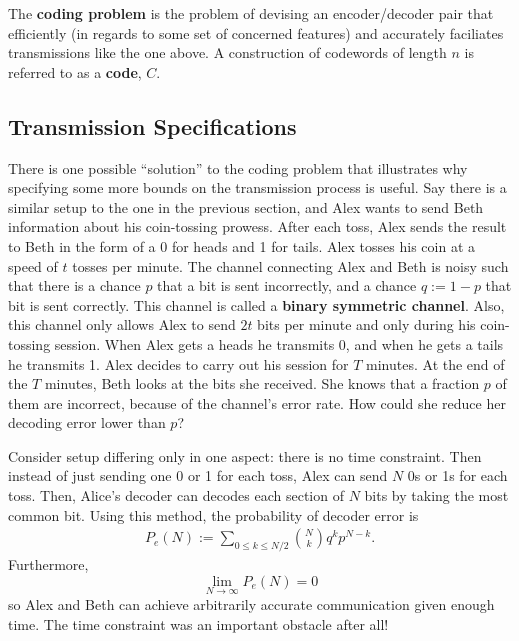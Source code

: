 \documentclass{article}
\renewcommand{\=}{\equiv}
\newcommand{\ra}{\rightarrow}
\begin{document}
The \textbf{coding problem} is the problem of devising an encoder/decoder pair that efficiently (in regards to some set of concerned features) and accurately faciliates transmissions like the one above. A construction of codewords of length $n$ is referred to as a \textbf{code}, $C$.

\subsection{Transmission Specifications}
\label{sec:trans-spec}

There is one possible ``solution'' to the coding problem that illustrates why specifying some more bounds on the transmission process is useful.
Say there is a similar setup to the one in the previous section, and Alex wants to send Beth information about his coin-tossing prowess.
After each toss, Alex sends the result to Beth in the form of a 0 for heads and 1 for tails.
Alex tosses his coin at a speed of $t$ tosses per minute.
The channel connecting Alex and Beth is noisy such that there is a chance $p$ that a bit is sent incorrectly, and a chance $q := 1-p$  that bit is sent correctly.
This channel is called a \textbf{binary symmetric channel}.
Also, this channel only allows Alex to send $2t$ bits per minute and only during his coin-tossing session.
When Alex gets a heads he transmits 0, and when he gets a tails he transmits 1.
Alex decides to carry out his session for $T$ minutes.
At the end of the $T$ minutes, Beth looks at the bits she received.
She knows that a fraction $p$ of them are incorrect, because of the channel's error rate. How could she reduce her decoding error lower than $p$?

Consider setup differing only in one aspect: there is no time constraint.
Then instead of just sending one 0 or 1 for each toss, Alex can send $N$ 0s or 1s for each toss.
Then, Alice's decoder can decodes each section of $N$ bits by taking the most common bit.
Using this method, the probability of decoder error is
\begin{align}
  P_e(N) := \sum_{0 \leq k \leq N/2} \binom{N}{k} q^k p^{N-k}.
\end{align}
Furthermore,
$$ \lim_{N \ra \infty} P_e(N) = 0 $$
so Alex and Beth can achieve arbitrarily accurate communication given enough time.
The time constraint was an important obstacle after all!

\end{document}
